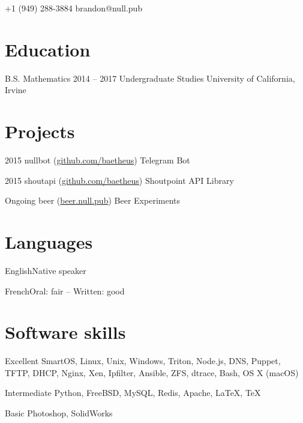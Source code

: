 \documentclass{tccv}
\begin{document}
    {+1 (949) 288-3884}
    {brandon@null.pub}

\section{Education}

\begin{yearlist}

\item[B.S. Mathematics]{2014 -- 2017}
     {Undergraduate Studies}
     {University of California, Irvine}

\end{yearlist}

\section{Projects}

\begin{yearlist}

\item{2015}
     {nullbot (\href{https://github.com/baetheus/nullbot-core}{github.com/baetheus})}
     {Telegram Bot}

\item{2015}
     {shoutapi (\href{https://github.com/baetheus/shoutapi}{github.com/baetheus})}
     {Shoutpoint API Library}

\item{Ongoing}
     {beer (\href{https://beer.null.pub}{beer.null.pub})}
     {Beer Experiments}

\end{yearlist}

\section{Languages}

\begin{factlist}
\item{English}{Native speaker}
\item{French}{Oral: fair -- Written: good}
\end{factlist}

\section{Software skills}

\begin{factlist}

\item{Excellent}
     {SmartOS, Linux, Unix, Windows, Triton, Node.js, DNS, Puppet, TFTP, DHCP, Nginx, Xen, Ipfilter, Ansible, ZFS, dtrace, Bash, OS X (macOS)}

\item{Intermediate}
     {Python, FreeBSD, MySQL, Redis, Apache, \LaTeX, \TeX}

\item{Basic}
     {Photoshop, SolidWorks}

\end{factlist}
\end{document}
